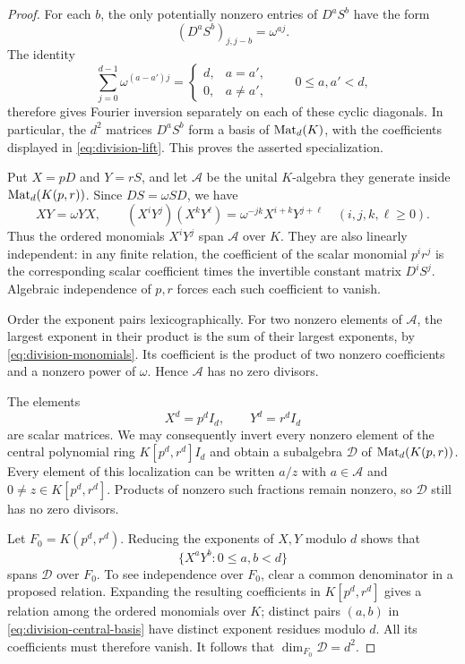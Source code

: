 \begin{proof}
For each $b$, the only potentially nonzero entries of $D^aS^b$ have the
form
\[
  (D^aS^b)_{j,j-b}=\omega^{aj}.
\]
The identity
\[
  \sum_{j=0}^{d-1}\omega^{(a-a')j}
  =\begin{cases}d,&a=a',\\0,&a\ne a',\end{cases}
  \qquad 0\leq a,a'<d,
\]
therefore gives Fourier inversion separately on each of these cyclic
diagonals.  In particular, the $d^2$ matrices $D^aS^b$ form a basis of
$\operatorname{Mat}_d(K)$, with the coefficients displayed in
\eqref{eq:division-lift}.  This proves the asserted specialization.

Put $X=pD$ and $Y=rS$, and let $\mathcal A$ be the unital
$K$-algebra they generate inside $\operatorname{Mat}_d(K(p,r))$.  Since
$DS=\omega SD$, we have
\begin{equation}\label{eq:division-monomials}
  XY=\omega YX,
  \qquad
  (X^iY^j)(X^kY^\ell)
    =\omega^{-jk}X^{i+k}Y^{j+\ell}
  \quad(i,j,k,\ell\geq0).
\end{equation}
Thus the ordered monomials $X^iY^j$ span $\mathcal A$ over $K$.
They are also linearly independent: in any finite relation, the
coefficient of the scalar monomial $p^i r^j$ is the corresponding
scalar coefficient times the invertible constant matrix $D^iS^j$.
Algebraic independence of $p,r$ forces each such coefficient to vanish.

Order the exponent pairs lexicographically.  For two nonzero elements
of $\mathcal A$, the largest exponent in their product is the sum of
their largest exponents, by \eqref{eq:division-monomials}.  Its
coefficient is the product of two nonzero coefficients and a nonzero
power of $\omega$.  Hence $\mathcal A$ has no zero divisors.

The elements
\[
  X^d=p^dI_d,
  \qquad Y^d=r^dI_d
\]
are scalar matrices.  We may consequently invert every nonzero
element of the central polynomial ring $K[p^d,r^d]I_d$ and obtain a
subalgebra $\mathcal D$ of $\operatorname{Mat}_d(K(p,r))$.  Every element of this
localization can be written $a/z$ with $a\in\mathcal A$ and
$0\ne z\in K[p^d,r^d]$.  Products of nonzero such fractions remain
nonzero, so $\mathcal D$ still has no zero divisors.

Let $F_0=K(p^d,r^d)$.  Reducing the exponents of $X,Y$ modulo $d$
shows that
\begin{equation}\label{eq:division-central-basis}
  \{X^aY^b:0\leq a,b<d\}
\end{equation}
spans $\mathcal D$ over $F_0$.  To see independence over $F_0$,
clear a common denominator in a proposed relation.  Expanding the
resulting coefficients in $K[p^d,r^d]$ gives a relation among the
ordered monomials over $K$; distinct pairs $(a,b)$ in
\eqref{eq:division-central-basis} have distinct exponent residues
modulo $d$.  All its coefficients must therefore vanish.
It follows that $\dim_{F_0}\mathcal D=d^2$.


\end{proof}
